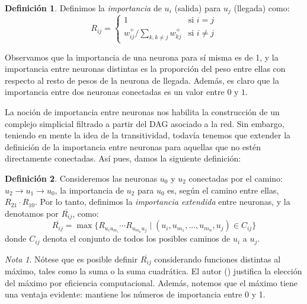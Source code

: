 \documentclass[12pt, a4paper, twoside]{book}
\numberwithin{equation}{section}
\theoremstyle{definition}
\newtheorem{defi}{Definición}[section]
\theoremstyle{remark}
\newtheorem*{remark}{Nota}
\theoremstyle{plain}
\begin{document}
	\begin{defi}
	Definimos la \textit{importancia} de $u_{i}$ (salida) para $u_{j}$ 
	(llegada) como:
	\begin{equation*}
		R_{ij}=  \left \{ 
			\begin{array}{ll}
				1 & \text{si } i=j \\
				w_{ij}^{+}/\sum_{k,k \neq j}w_{kj}^{+} & \text{si } i \neq j
			\end{array}
		\right. 
	\end{equation*}
	\end{defi}
	Observamos que la importancia de una neurona para sí misma es de 1, y 
	la importancia entre neuronas distintas es la proporción del peso 
	entre ellas con respecto al resto de pesos de la neurona de llegada. 
	Además, es claro que la importancia entre dos neuronas conectadas es 
	un valor entre $0$ y $1$.

	La noción de importancia entre neuronas nos habilita la construcción 
	de un complejo simplicial filtrado a partir del DAG asociado a la red. 
	Sin embargo, teniendo en mente la idea de la transitividad, todavía 
	tenemos que extender la definición de la importancia entre neuronas 
	para aquellas que no estén directamente conectadas. Así pues, damos la 
	siguiente definición: 
	\begin{defi}
		\label{def:impExt}	
	Consideremos las neuronas $u_{0}$ y $u_{2}$ conectadas por el camino: 
	$u_{2} 
	\rightarrow u_{1} \rightarrow u_{0}$, la importancia de $u_{2}$ para 
	$u_{0}$ es, según el camino entre ellas, $R_{21} \cdot R_{10}$.
	Por lo tanto, definimos la \textit{importancia extendida} entre 
	neuronas, y la denotamos por $\overline{R_{ij}}$, como:
	\begin{equation*}
		\overline{R_{ij}}=\max\{R_{u_{i}u_{m_{1}}} \cdots
		R_{u_{m_{n}}u_{j}} \mid (u_{i},u_{m_{1}},...,u_{m_{n}},u_{j}) 
	\in C_{ij} \}
	\end{equation*}	
	donde $C_{ij}$ denota el conjunto de todos los posibles caminos de 
	$u_{i}$ a $u_{j}$. 
	\end{defi}

	\begin{remark}
	Nótese que es posible definir $\overline{R_{ij}}$ considerando 
	funciones distintas al máximo, tales como la suma o la suma 
	cuadrática. El autor (\cite{Articulo-Watanabe}) justifica la 
	elección del máximo por eficiencia computacional. Además, notemos que 
	el máximo tiene una ventaja evidente: mantiene los números de 
	importancia entre 0 y 1.
	\end{remark}
\end{document}
